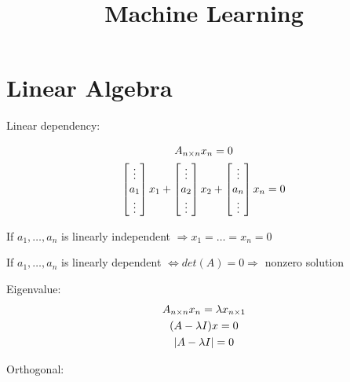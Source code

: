 \documentclass{blog}
\title{Machine Learning}
\begin{document}
\maketitle
\tableofcontents
\section{Linear Algebra}
\begin{definition}
    Linear dependency:

    \begin{gather*}
        A_{n \times n} x_{n \time 1} = 0 \\
        \begin{bmatrix}\vdots \\ a_{1} \\ \vdots\end{bmatrix} x_{1}
        + \begin{bmatrix}\vdots \\ a_{2} \\ \vdots\end{bmatrix} x_{2}
        + \begin{bmatrix}\vdots \\ a_{n} \\ \vdots\end{bmatrix} x_{n} = 0
    \end{gather*}

    If $a_{1}, \dots, a_{n}$ is linearly independent $\Rightarrow x_{1} = \dots = x_{n} = 0$

    If $a_{1}, \dots, a_{n}$ is linearly dependent $\Leftrightarrow det(A) = 0 \Rightarrow$ nonzero solution
\end{definition}

\begin{definition}
    Eigenvalue:
    \begin{gather}
        A_{n \times n}x_{n \time 1} = \lambda x_{n \times 1} \label{eq:eigen-value} \\
        (A - \lambda I) x = 0 \nonumber \\
        |A - \lambda I| = 0
    \end{gather}

\end{definition}

\begin{definition}
    Orthogonal:
\end{definition}
\end{document}
